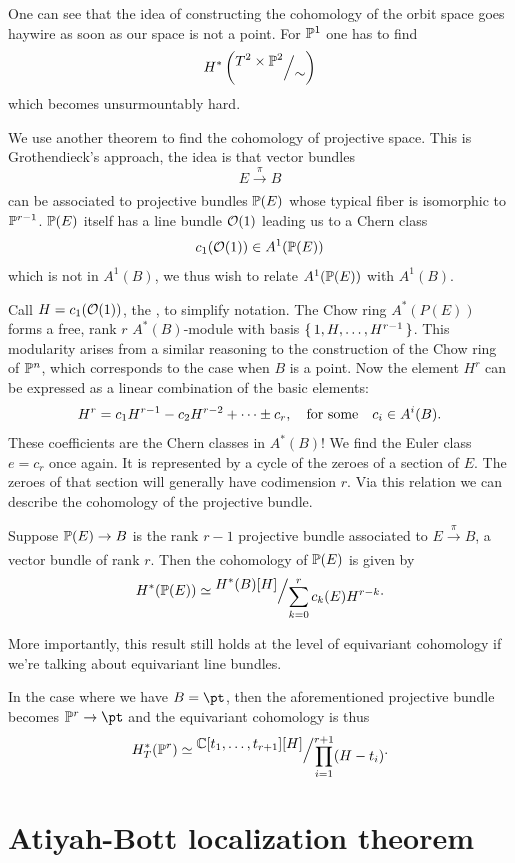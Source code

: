 \documentclass[12pt]{memoir}
\begin{document}
    One can see that the idea of constructing the cohomology of the orbit space goes haywire as soon as our space is not a point. For $\mathbb{P}^1$ one has to find
    $$H^\ast\left(\quot{T^2\x\bP^2}{\sim}\right)$$
    which becomes unsurmountably hard.\par
We use another theorem to find the cohomology of projective space. This is Grothendieck's approach, the idea is that vector bundles 
$$E\xrightarrow[]{\pi}B$$
can be associated to projective bundles $\mathbb{P}(E)$ whose typical fiber is isomorphic to $\mathbb{P}^{r-1}$. $\mathbb{P}(E)$ itself has a line bundle $\mathcal{O}(1)$ leading us to a Chern class
$$c_1(\mathcal{O}(1))\in A^1(\mathbb{P}(E))$$
which is not in $A^1(B)$, we thus wish to relate $A^1(\mathbb{P}(E))$ with $A^1(B)$.\par
Call $H=c_1(\mathcal{O}(1))$, the , to simplify notation. The Chow ring $A^\ast(P(E))$ forms a free, rank $r$ $A^\ast(B)$-module with basis $\{\,1,H,\dots,H^{r-1}\,\}$. This modularity arises from a similar reasoning to the construction of the Chow ring of $\mathbb{P}^n$, which corresponds to the case when $B$ is a point. Now the element $H^r$ can be expressed as a linear combination of the basic elements: 
$$H^r=c_1H^{r-1}-c_2H^{r-2}+\dots\pm c_r,\quad\text{for some}\quad c_i\in A^i(B).$$
These coefficients are the Chern classes in $A^\ast(B)$! We find the Euler class $e=c_r$ once again. It is represented by a cycle of the zeroes of a section of $E$. The zeroes of that section will generally have codimension $r$. Via this relation we can describe the cohomology of the projective bundle.

\begin{Th}
    Suppose $\mathbb{P}(E)\to B$ is the rank $r-1$ projective bundle associated to $E\xrightarrow[]{\pi}B$, a vector bundle of rank $r$. Then the cohomology of $\mathbb{P}(E)$ is given by
    $$H^\ast(\bP(E))\isom\quot{H^\ast(B)[H]}{\sum_{k=0}^{r}c_k(E)H^{r-k}}.$$
\end{Th}
More importantly, this result still holds at the level of equivariant cohomology if we're talking about equivariant line bundles.

\begin{Ex}
    In the case where we have $B=\pt$, then the aforementioned projective bundle becomes $\bP^{r}\to\pt$ and the equivariant cohomology is thus 
    $$H^\ast_T(\bP^{r})\isom\quot{\bC[t_1,\dots,t_{r+1}][H]}{\prod_{i=1}^{r+1}(H-t_i)}.$$
\end{Ex}

\section{Atiyah-Bott localization theorem}
\end{document}
